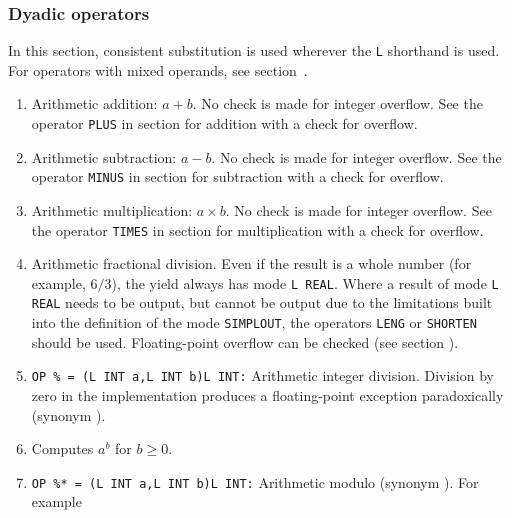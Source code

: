 \subsubsection*{Dyadic operators}
In this section, consistent substitution is used wherever the \verb|L|
shorthand is used. For operators with mixed operands, see
section~.
\begin{enumerate}
\item {}\newline
Arithmetic addition: $a+b$. No check is made for integer overflow. See the
operator \verb|PLUS| in section  for addition with
a check for overflow.
\item {}\newline
Arithmetic subtraction: $a-b$. No check is made for integer
overflow. See the operator \verb|MINUS| in section  for
subtraction with a check for overflow.
\item {}\newline
Arithmetic multiplication: $a\times b$. No check is made for
integer overflow. See the operator \verb|TIMES| in
section  for multiplication with a check for overflow.
\item {}\newline
Arithmetic fractional division. Even if the result is a whole number
(for example, $6/3$), the yield always has mode \verb|L REAL|. Where a
result of mode \verb|L REAL| needs to be output, but cannot be output
due to the limitations built into the definition of the mode
\verb|SIMPLOUT|, the operators \verb|LENG| or \verb|SHORTEN| should be
used. Floating-point overflow can be checked (see
section ).
\item \verb|OP % = (L INT a,L INT b)L INT:|\newline
Arithmetic integer division. Division by zero in the
implementation produces a floating-point exception paradoxically
(synonym ).
\item {}\newline
Computes $a^b$ for $b\geq0$.
\item \verb|OP %* = (L INT a,L INT b)L INT:|\newline
Arithmetic modulo (synonym ). For example

\end{enumerate}

